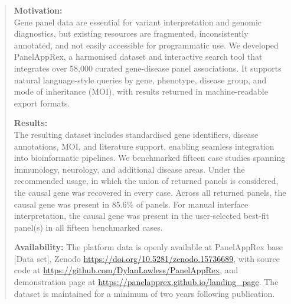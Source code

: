 \clearpage
\begin{abstract}
\noindent \textbf{Motivation:}\\
Gene panel data are essential for variant interpretation and genomic diagnostics, but existing resources are fragmented, inconsistently annotated, and not easily accessible for programmatic use. 
We developed PanelAppRex, a harmonised dataset and interactive search tool that integrates over 58,000 curated gene-disease panel associations. It supports natural language-style queries by gene, phenotype, disease group, and mode of inheritance (MOI), with results returned in machine-readable export formats. 

\vspace{1em}

\noindent \textbf{Results:}\\
The resulting dataset includes standardised gene identifiers, disease annotations, MOI, and literature support, enabling seamless integration into bioinformatic pipelines. 
We benchmarked fifteen case studies spanning immunology, neurology, and additional disease areas. Under the recommended usage, in which the union of returned panels is considered, the causal gene was recovered in every case. Across all returned panels, the causal gene was present in 85.6\% of panels. For manual interface interpretation, the causal gene was present in the user-selected best-fit panel(s) in all fifteen benchmarked cases.

\vspace{1em}

\noindent \textbf{Availability:} The platform data is openly available at  PanelAppRex base [Data set], Zenodo \url{https://doi.org/10.5281/zenodo.15736689}, with
source code at \url{https://github.com/DylanLawless/PanelAppRex},
and demonstration page at \url{https://panelapprex.github.io/landing_page}. 
The dataset is maintained for a minimum of two years following publication.
\end{abstract}
\clearpage

